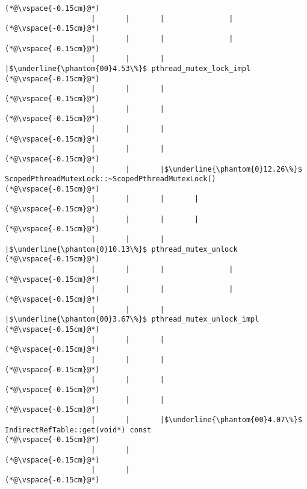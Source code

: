 \begin{lstlisting}[caption=20 viiteparametria (C$\to$Java) , label=profile:C2JBenchmark00206, numberbychapter=true, frame=lines]
(*@\vspace{-0.15cm}@*)
                    |       |       |               |
(*@\vspace{-0.15cm}@*)
                    |       |       |               |
(*@\vspace{-0.15cm}@*)
                    |       |       |               |$\underline{\phantom{00}4.53\%}$ pthread_mutex_lock_impl
(*@\vspace{-0.15cm}@*)
                    |       |       |        
(*@\vspace{-0.15cm}@*)
                    |       |       |        
(*@\vspace{-0.15cm}@*)
                    |       |       |
(*@\vspace{-0.15cm}@*)
                    |       |       |
(*@\vspace{-0.15cm}@*)
                    |       |       |$\underline{\phantom{0}12.26\%}$ ScopedPthreadMutexLock::~ScopedPthreadMutexLock()
(*@\vspace{-0.15cm}@*)
                    |       |       |       |
(*@\vspace{-0.15cm}@*)
                    |       |       |       |
(*@\vspace{-0.15cm}@*)
                    |       |       |       |$\underline{\phantom{0}10.13\%}$ pthread_mutex_unlock
(*@\vspace{-0.15cm}@*)
                    |       |       |               |
(*@\vspace{-0.15cm}@*)
                    |       |       |               |
(*@\vspace{-0.15cm}@*)
                    |       |       |               |$\underline{\phantom{00}3.67\%}$ pthread_mutex_unlock_impl
(*@\vspace{-0.15cm}@*)
                    |       |       |        
(*@\vspace{-0.15cm}@*)
                    |       |       |        
(*@\vspace{-0.15cm}@*)
                    |       |       |
(*@\vspace{-0.15cm}@*)
                    |       |       |
(*@\vspace{-0.15cm}@*)
                    |       |       |$\underline{\phantom{00}4.07\%}$ IndirectRefTable::get(void*) const
(*@\vspace{-0.15cm}@*)
                    |       |
(*@\vspace{-0.15cm}@*)
                    |       |
(*@\vspace{-0.15cm}@*)

\end{lstlisting}
